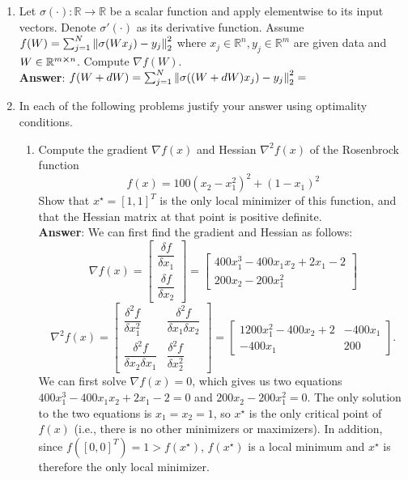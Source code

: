\documentclass{article}
\begin{document}
\begin{enumerate}
\begin{enumerate}
          \end{enumerate}
    \item Let $\sigma(\cdot):\mathbb{R}\rightarrow\mathbb{R}$ be a scalar function and apply elementwise to its input vectors. Denote $\sigma'(\cdot)$ as its derivative function. Assume $f(W)=\sum_{j=1}^N\norm{\sigma(Wx_j)-y_j}_2^2$ where $x_j\in\mathbb{R}^n,y_j\in\mathbb{R}^m$ are given data and $W\in\mathbb{R}^{m\cross n}$. Compute $\nabla f(W)$.\\
          \textbf{Answer}: $f(W+dW)=\sum_{j=1}^N\norm{\sigma((W+dW)x_j)-y_j}_2^2=$
    \item In each of the following problems justify your answer using optimality conditions.
          \begin{enumerate}
              \item Compute the gradient $\nabla f(x)$ and Hessian $\nabla^2 f(x)$ of the Rosenbrock function \[f(x)=100(x_2-x_1^2)^2+(1-x_1)^2\] Show that $x^\star=[1,1]^T$ is the only local minimizer of this function, and that the Hessian matrix at that point is positive definite.\\
                    \textbf{Answer}: We can first find the gradient and Hessian as follows: \[
                        \nabla f(x)=\begin{bmatrix}
                            \dfrac{\delta f}{\delta x_1} \\\dfrac{\delta f}{\delta x_2}
                        \end{bmatrix}=\begin{bmatrix}
                            400x_1^3-400x_1x_2+2x_1-2 \\200x_2-200x_1^2
                        \end{bmatrix}
                    \]\[
                        \nabla^2 f(x)=\begin{bmatrix}
                            \dfrac{\delta^2 f}{\delta x_1^2} & \dfrac{\delta^2 f}{\delta x_1\delta x_2} \\\dfrac{\delta^2 f}{\delta x_2\delta x_1}&\dfrac{\delta^2 f}{\delta x_2^2}
                        \end{bmatrix}=\begin{bmatrix}
                            1200x_1^2-400x_2+2 & -400x_1 \\
                            -400x_1            & 200
                        \end{bmatrix}.
                    \]
                    We can first solve $\nabla f(x)=0$, which gives us two equations $400x_1^3-400x_1x_2+2x_1-2=0$ and $200x_2-200x_1^2=0$. The only solution to the two equations is $x_1=x_2=1$, so $x^\star$ is the only critical point of $f(x)$ (i.e., there is no other minimizers or maximizers). In addition, since $f([0,0]^T)=1>f(x^\star)$, $f(x^\star)$ is a local minimum and $x^\star$ is therefore the only local minimizer.\\

\end{enumerate}
\end{enumerate}
\end{document}
